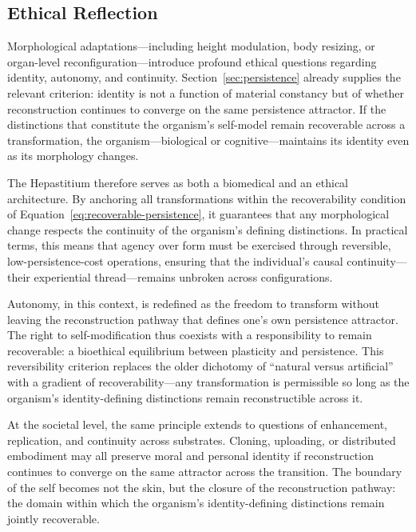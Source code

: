 \documentclass[12pt]{article}
\begin{document}
\subsection{Ethical Reflection}
\label{sec:ethics}

Morphological adaptations---including height modulation, body resizing, or organ-level reconfiguration---introduce profound ethical questions regarding identity, autonomy, and continuity. Section~\ref{sec:persistence} already supplies the relevant criterion: identity is not a function of material constancy but of whether reconstruction continues to converge on the same persistence attractor. If the distinctions that constitute the organism's self-model remain recoverable across a transformation, the organism---biological or cognitive---maintains its identity even as its morphology changes.

The Hepastitium therefore serves as both a biomedical and an ethical architecture. By anchoring all transformations within the recoverability condition of Equation~\eqref{eq:recoverable-persistence}, it guarantees that any morphological change respects the continuity of the organism's defining distinctions. In practical terms, this means that agency over form must be exercised through reversible, low-persistence-cost operations, ensuring that the individual's causal continuity---their experiential thread---remains unbroken across configurations.

Autonomy, in this context, is redefined as the freedom to transform without leaving the reconstruction pathway that defines one's own persistence attractor. The right to self-modification thus coexists with a responsibility to remain recoverable: a bioethical equilibrium between plasticity and persistence. This reversibility criterion replaces the older dichotomy of ``natural versus artificial'' with a gradient of recoverability---any transformation is permissible so long as the organism's identity-defining distinctions remain reconstructible across it.

At the societal level, the same principle extends to questions of enhancement, replication, and continuity across substrates. Cloning, uploading, or distributed embodiment may all preserve moral and personal identity if reconstruction continues to converge on the same attractor across the transition. The boundary of the self becomes not the skin, but the closure of the reconstruction pathway: the domain within which the organism's identity-defining distinctions remain jointly recoverable.
\end{document}
